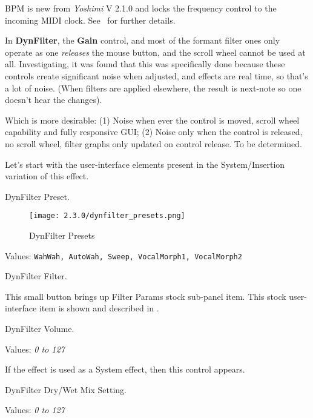    BPM is new from \textsl{Yoshimi} V 2.1.0 and locks the frequency control to the
   incoming MIDI clock. See \ for further details.

   In \textbf{DynFilter}, the \textbf{Gain} control, and most of the formant
   filter ones only operate as one \textsl{releases} the mouse button, and the
   scroll wheel cannot be used at all.  Investigating, it was found that this
   was specifically done because these controls create significant noise when
   adjusted, and effects are real time, so that's a lot of noise. (When filters
   are applied elsewhere, the result is next-note so one doesn't hear the
   changes).

   Which is more desirable:
   (1) Noise when ever the control is moved, scroll wheel capability and fully
   responsive GUI;
   (2) Noise only when the control is released, no scroll wheel, filter graphs
   only updated on control release.
   To be determined.

   Let's start with the user-interface elements present in the
   System/Insertion variation of this effect.

   \setcounter{ItemCounter}{0}      %

   DynFilter Preset.

\begin{figure}[H]
   \centering
   \texttt{[image: 2.3.0/dynfilter\_presets.png]}
   \caption{DynFilter Presets}
   \label{fig:effects_dynfilter_presets}
\end{figure}

   Values: \texttt{WahWah, AutoWah, Sweep, VocalMorph1, VocalMorph2}

   DynFilter Filter.

   This small button brings up Filter Params stock sub-panel item.
   This stock user-interface item is shown and described in
   .

   DynFilter Volume.

   Values: \textsl{0 to 127}

   If the effect is used as a System effect, then this control appears.

   DynFilter Dry/Wet Mix Setting.

   Values: \textsl{0 to 127}

